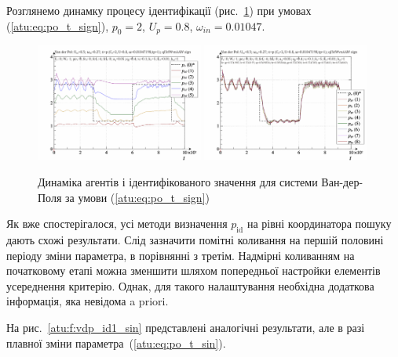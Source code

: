 Розглянемо динамку процесу ідентифікації (рис.~\ref{atu:f:vdp_id1_sign})
при умовах (\ref{atu:eq:po_t_sign}),
$ p_0 = 2 $,
$ U_p = 0.8 $,
$ \omega_{in} = 0.01047 $.

\begin{figure}[ht!]
\begin{center}
  \includegraphics[width=0.49\textwidth]{p/cha/vdp/vdp_id-p_t_pi_ql3rlWvnAAW_sign.png}
  \hfill
  \includegraphics[width=0.49\textwidth]{p/cha/vdp/vdp_id-p_t_p_ql3rlWvnAAW_sign.png}
\end{center}
\caption{Динаміка агентів і ідентифікованого значення для системи Ван-дер-Поля за умови (\ref{atu:eq:po_t_sign})}
\label{atu:f:vdp_id1_sign}
\end{figure}

Як вже спостерігалося, усі методи визначення
$ p_\mathrm{id} $ на рівні координатора пошуку дають схожі
результати. Слід зазначити помітні коливання на першій половині
періоду зміни параметра, в порівнянні з третім. Надмірні
коливанням на початковому етапі можна зменшити шляхом
попередньої настройки елементів усереднення критерію. Однак,
для такого налаштування необхідна додаткова інформація, яка
невідома a priori.

На рис.~\ref{atu:f:vdp_id1_sin} представлені аналогічні результати, але
в разі плавної зміни параметра~(\ref{atu:eq:po_t_sin}).

